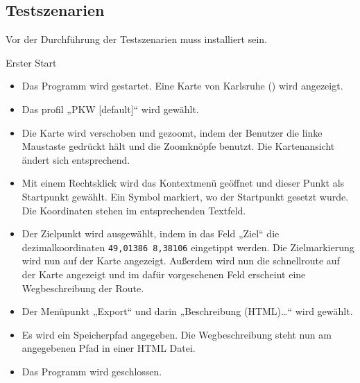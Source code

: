 \documentclass[a4paper, 11pt]{article}
\makeatletter
\def\namedlabel#1#2{\begingroup
    #2%
    \def\@currentlabel{#2}%
    \phantomsection\label{#1}\endgroup
}
\newcommand{\oitem}[2]{
  \@ifundefined{c@oitem#1}{\newcounter{oitem#1}}{} %
  \addtocounter{oitem#1}{10}
  \item[\namedlabel{#1:#2}{/#1\arabic{oitem#1}/}]
}
\makeatother
\begin{document}
\subsection{Testszenarien}
Vor der Durchführung der Testszenarien muss \routeKIT installiert sein.
\begin{description}
\oitem{TS}{ersterStart} Erster Start\\
\begin{itemize}
\item Das Programm \routeKIT wird gestartet. Eine Karte von Karlsruhe () wird angezeigt.
\item Das \gls{profil} „PKW [default]“ wird gewählt.
\item Die Karte wird verschoben und gezoomt, indem der Benutzer die linke Maustaste gedrückt hält und die Zoomknöpfe benutzt. Die Kartenansicht ändert sich entsprechend.
\item Mit einem Rechtsklick wird das Kontextmenü geöffnet und dieser Punkt als Startpunkt gewählt. Ein Symbol markiert, wo der Startpunkt gesetzt wurde. Die Koordinaten stehen im entsprechenden Textfeld.
\item Der Zielpunkt wird ausgewählt, indem in das Feld „Ziel“ die \gls{dezimalkoordinaten} \texttt{49,01386 8,38106} eingetippt werden. Die Zielmarkierung wird nun auf der Karte angezeigt. Außerdem wird nun die \gls{schnellroute} auf der Karte angezeigt und im dafür vorgesehenen Feld erscheint eine Wegbeschreibung der Route.
\item Der  Menüpunkt „Export“ und darin „Beschreibung (HTML)\ldots“ wird gewählt.
\item Es wird ein Speicherpfad angegeben. Die Wegbeschreibung steht nun am angegebenen Pfad in einer HTML Datei.
\item Das Programm wird geschlossen.
\end{itemize}



\end{description}
\end{document}
